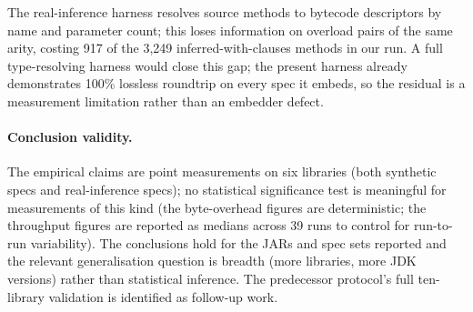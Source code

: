 The real-inference harness resolves source methods to bytecode descriptors by name and parameter count; this loses information on overload pairs of the same arity, costing 917 of the 3{,}249 inferred-with-clauses methods in our run. A full type-resolving harness would close this gap; the present harness already demonstrates 100\% lossless roundtrip on every spec it embeds, so the residual is a measurement limitation rather than an embedder defect.

\paragraph{Conclusion validity.}
The empirical claims are point measurements on six libraries (both synthetic specs and real-inference specs); no statistical significance test is meaningful for measurements of this kind (the byte-overhead figures are deterministic; the throughput figures are reported as medians across 39 runs to control for run-to-run variability). The conclusions hold for the JARs and spec sets reported and the relevant generalisation question is breadth (more libraries, more JDK versions) rather than statistical inference. The predecessor protocol's full ten-library validation is identified as follow-up work.
